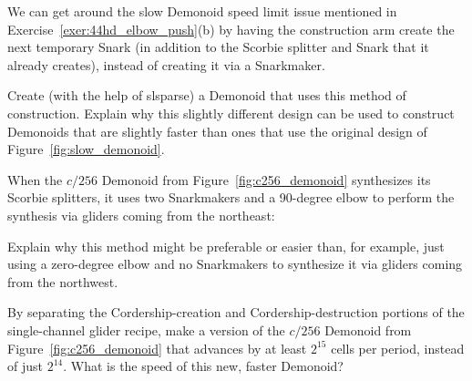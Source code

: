 \begin{multicols}{2}
	\mfilbreak
	
	
	\begin{problem}\label{exer:slow_demonoid_no_snarkbreaker}
		We can get around the slow Demonoid speed limit issue mentioned in Exercise~\ref{exer:44hd_elbow_push}(b) by having the construction arm create the next temporary Snark (in addition to the Scorbie splitter and Snark that it already creates), instead of creating it via a Snarkmaker.
		
		Create (with the help of slsparse) a Demonoid that uses this method of construction. Explain why this slightly different design can be used to construct Demonoids that are slightly faster than ones that use the original design of Figure~\ref{fig:slow_demonoid}.
		
	\end{problem}
	
	
	\mfilbreak
	
	
	\begin{problemstar}\label{exer:why_scorbie_splitter_snarkmakers}
		When the $c/256$ Demonoid from Figure~\ref{fig:c256_demonoid} synthesizes its Scorbie splitters, it uses two Snarkmakers and a 90-degree elbow to perform the synthesis via gliders coming from the northeast:
		
		\noindent\begin{center}
		\end{center}
		
		Explain why this method might be preferable or easier than, for example, just using a zero-degree elbow and no Snarkmakers to synthesize it via gliders coming from the northwest.
	\end{problemstar}


	\mfilbreak
	
	
	\begin{problem}\label{exer:middling_demonoid_faster}
		By separating the Cordership-creation and Cordership-destruction portions of the single-channel glider recipe, make a version of the $c/256$ Demonoid from Figure~\ref{fig:c256_demonoid} that advances by at least $2^{15}$ cells per period, instead of just $2^{14}$. What is the speed of this new, faster Demonoid?
		

\end{problem}
\end{multicols}
